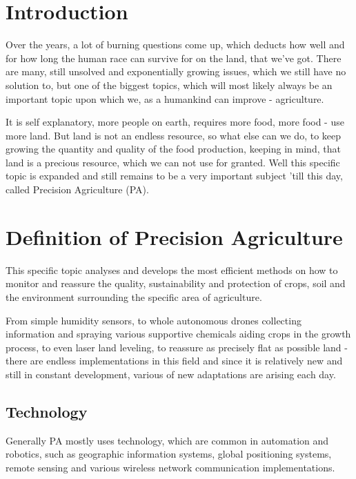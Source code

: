 \documentclass[11pt,a5paper,footinclude=true,headinclude=true, oneside]{scrbook}
\begin{document}
\chapter{Introduction}
	
Over the years, a lot of burning questions come up, which deducts how well and for how long the human race can survive for on the land, that we've got. There are many, still unsolved and exponentially growing issues, which we still have no solution to, but one of the biggest topics, which will most likely always be an important topic upon which we, as a humankind can improve - agriculture.
    
It is self explanatory, more people on earth, requires more food, more food - use more land. But land is not an endless resource, so what else can we do, to keep growing the quantity and quality of the food production, keeping in mind, that land is a precious resource, which we can not use for granted. Well this specific topic is expanded and still remains to be a very important subject 'till this day, called Precision Agriculture (PA).
    
    
\chapter{Definition of Precision Agriculture}
    
This specific topic analyses and develops the most efficient methods on how to monitor and reassure the quality, sustainability and protection of crops, soil and the environment surrounding the specific area of agriculture.
    
From simple humidity sensors, to whole autonomous drones collecting information and spraying various supportive chemicals aiding crops in the growth process, to even laser land leveling, to reassure as precisely flat as possible land - there are endless implementations in this field and since it is relatively new and still in constant development, various of new adaptations are arising each day.
    

\section{Technology}

Generally PA mostly uses technology, which are common in automation and robotics, such as geographic information systems, global positioning systems, remote sensing and various wireless network communication implementations.
\end{document}
